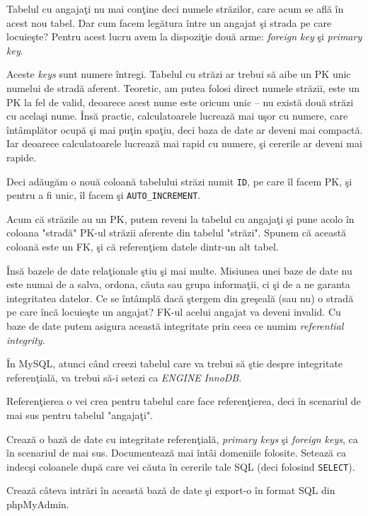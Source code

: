 Tabelul cu angajaţi nu mai conţine deci numele străzilor, care acum se află
în acest nou tabel. Dar cum facem legătura între un angajat şi strada pe care
locuieşte? Pentru acest lucru avem la dispoziţie două arme: \textsl{foreign key}
şi \textsl{primary key}.

Aceste \textit{keys} sunt numere întregi. Tabelul cu străzi ar trebui să aibe
un PK unic numelui de stradă aferent. Teoretic, am putea folosi direct
numele străzii, este un PK la fel de valid, deoarece acest nume este oricum unic --
nu există două străzi cu acelaşi nume. Însă practic, calculatoarele lucrează
mai uşor cu numere, care întâmplător ocupă şi mai puţin spaţiu, deci baza de date
ar deveni mai compactă. Iar deoarece calculatoarele lucrează mai rapid cu numere,
şi cererile ar deveni mai rapide.

Deci adăugăm o nouă coloană tabelului străzi numit \texttt{ID}, pe care îl facem
PK, şi pentru a fi unic, îl facem şi \texttt{AUTO\_INCREMENT}.

Acum că străzile au un PK, putem reveni la tabelul cu angajaţi şi pune acolo
în coloana "stradă" PK-ul străzii aferente din tabelul "străzi". Spunem că
această coloană este un FK, şi că referenţiem datele dintr-un alt tabel.

Însă bazele de date relaţionale ştiu şi mai multe. Misiunea unei baze de date
nu este numai de a salva, ordona, căuta sau grupa informaţii, ci şi de a ne
garanta integritatea datelor. Ce se întâmplă dacă ştergem din greşeală (sau nu)
o stradă pe care încă locuieşte un angajat? FK-ul acelui angajat va deveni
invalid. Cu baze de date putem asigura această integritate prin ceea ce numim
\textsl{referential integrity}.

În MySQL, atunci când creezi tabelul care va trebui să ştie despre integritate
referenţială, va trebui să-i setezi ca \textsl{ENGINE} \textsl{InnoDB}.

Referenţierea o vei crea pentru tabelul care face referenţierea, deci în scenariul
de mai sus pentru tabelul "angajaţi".

\begin{Exercise}[title={Referential Integrity}]
Crează o bază de date cu integritate referenţială, \textit{primary keys} şi
\textit{foreign keys}, ca în scenariul de mai sus. Documentează mai întâi domeniile
folosite. Setează ca indecşi coloanele după care vei căuta în cererile tale
SQL (deci folosind \texttt{SELECT}).

Crează câteva intrări în această bază de date şi export-o în format SQL din phpMyAdmin.
\end{Exercise}


